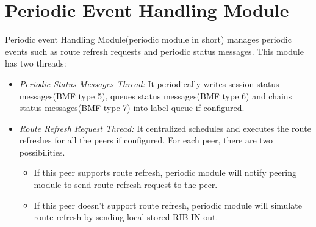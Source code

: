 \section{Periodic Event Handling Module}
\label{sec:periodic}
Periodic event Handling Module(periodic module in short) manages periodic events such as route refresh requests and periodic status messages.
This module has two threads:
\begin{itemize}
\item{\emph{Periodic Status Messages Thread:} It periodically writes session status messages(BMF type 5), queues status messages(BMF type 6) and chains status messages(BMF type 7) into label queue if configured.}
\item{\emph{Route Refresh Request Thread:} It centralized schedules and executes the route refreshes for all the peers if configured. For each peer, there are two possibilities. }
	\begin{itemize}
		\item{If this peer supports route refresh, periodic module will notify peering module to send route refresh request to the peer.}
		\item{If this peer doesn't support route refresh, periodic module will simulate route refresh by sending local stored RIB-IN out.}
	\end{itemize}
\end{itemize}

